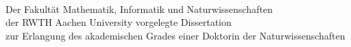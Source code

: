 \makeatletter
\begin{titlepage}
    \begin{center}
        \vspace*{1cm}

        \Large
        \textbf{\@title}

        \vspace{1.5cm}
        
        \thesistype{}
        
        \vspace{1cm}


        \vspace{1cm}

        \large
        \thesisauthor{}\\

        \vspace{1cm}
        \large
        Der Fakultät Mathematik, Informatik und Naturwissenschaften\\
        der RWTH Aachen University vorgelegte Dissertation\\
        zur Erlangung des akademischen Grades einer Doktorin der Naturwissenschaften

        \vspace{1cm}
        \@date

    \end{center}
\end{titlepage}
\makeatother
